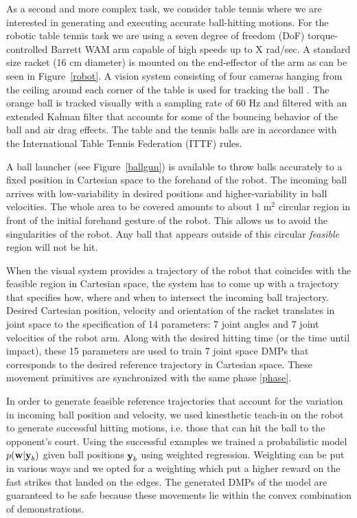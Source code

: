 
As a second and more complex task, we consider table tennis where we are interested in generating and executing accurate ball-hitting motions. For the robotic table tennis task we are using a seven degree of freedom (DoF) torque-controlled Barrett WAM arm capable of high speeds up to X rad/sec. A standard size racket (16 cm diameter) is mounted on the end-effector of the arm as can be seen in Figure~\ref{robot}. A vision system consisting of four cameras hanging from the ceiling around each corner of the table is used for tracking the ball \cite{Lampert12}. The orange ball is tracked  visually with a sampling rate of 60 Hz and filtered with an extended Kalman filter that accounts for some of the bouncing behavior of the ball and air drag effects. The table and the tennis balls are in accordance with the International Table Tennis Federation (ITTF) rules.

A ball launcher (see Figure~\ref{ballgun}) is available to throw balls accurately to a fixed position in Cartesian space to the forehand of the robot. The incoming ball arrives with low-variability in desired positions and higher-variability in ball velocities. The whole area to be covered amounts to about 1 m$^2$ circular region in front of the initial forehand gesture of the robot. This allows us to avoid the singularities of the robot. Any ball that appears outside of this circular \emph{feasible} region will not be hit.

When the visual system provides a trajectory of the robot that coincides with the feasible region in Cartesian space, the system has to come up with a trajectory that specifies how, where and when to intersect the incoming ball trajectory. Desired Cartesian position, velocity and orientation of the racket translates in joint space to the specification of 14 parameters: 7 joint angles and 7 joint velocities of the robot arm. Along with the desired hitting time (or the time until impact), these 15 parameters are used to train 7 joint space DMPs that corresponds to the desired reference trajectory in Cartesian space. These movement primitives are synchronized with the same phase \eqref{phase}.

In order to generate feasible reference trajectories that account for the variation in incoming ball position and velocity, we used kinesthetic teach-in on the robot to generate successful hitting motions, i.e. those that can hit the ball to the opponent's court. Using the successful examples we trained a probabilistic model $p(\boldsymbol{\mathrm{w}}|\boldsymbol{\mathrm{y}}_b)$ given ball positions $\boldsymbol{\mathrm{y}}_b$ using weighted regression. Weighting can be put in various ways and we opted for a weighting which put a higher reward on the fast strikes that landed on the edges. The generated DMPs of the model are guaranteed to be safe because these movements lie within the convex combination of demonstrations. 

